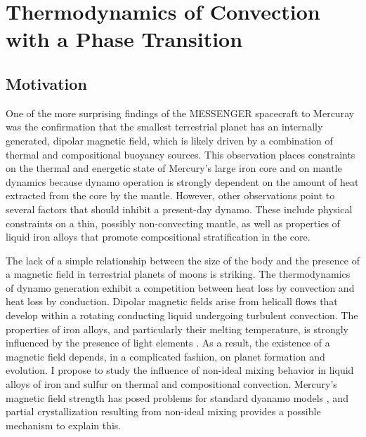 \chapter{Thermodynamics of Convection with a Phase Transition}\label{chap3}


\section{Motivation}

One of the more surprising findings of the MESSENGER spacecraft to Mercuray was
the confirmation that the smallest terrestrial planet has an internally
generated, dipolar magnetic field, which is likely driven by a combination of
thermal and compositional buoyancy sources. This observation places constraints
on the thermal and energetic state of Mercury’s large iron core and on mantle
dynamics because dynamo operation is strongly dependent on the amount of heat
extracted from the core by the mantle. However, other observations point to
several factors that should inhibit a present-day dynamo. These include
physical constraints on a thin, possibly non-convecting mantle, as well as
properties of liquid iron alloys that promote compositional stratification in
the core.

The lack of a simple relationship between the size of the body and the presence
of a magnetic field in terrestrial planets of moons is striking. The
thermodynamics of dynamo generation exhibit a competition between heat loss by
convection and heat loss by conduction.  Dipolar magnetic fields arise from
helicall flows that develop within a rotating conducting liquid undergoing
turbulent convection. The properties of iron alloys, and particularly their
melting temperature, is strongly influenced by the presence of light elements
\cite{sanloup00}. As a result, the existence of a magnetic field depends, in a
complicated fashion, on planet formation and evolution. I propose to study the
influence of non-ideal mixing behavior in liquid alloys of iron and sulfur on
thermal and compositional convection. Mercury's magnetic field strength has
posed problems for standard dyanamo models \cite{christensen06,stanley05}, and
partial crystallization resulting from non-ideal mixing provides a possible
mechanism to explain this.

